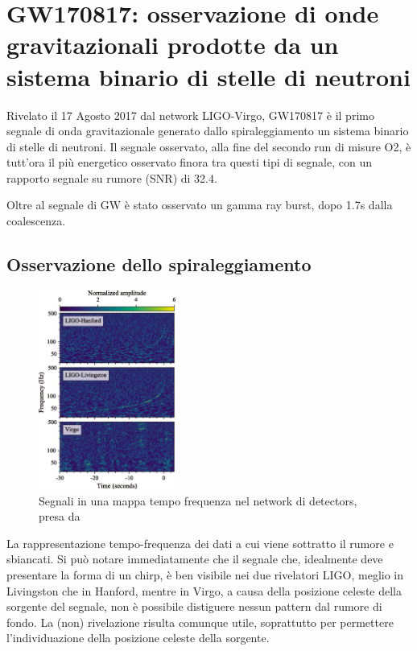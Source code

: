 \chapter[Osservazione di GW da BNS]{GW170817: osservazione di onde gravitazionali prodotte da un sistema binario di stelle di neutroni}
\label{chapter:gw170817}
Rivelato il 17 Agosto 2017 dal network LIGO-Virgo, GW170817 è il primo segnale di onda gravitazionale generato dallo spiraleggiamento un sistema binario di stelle di neutroni.
Il segnale osservato, alla fine del secondo run di misure O2, è tutt'ora il più energetico osservato finora tra questi tipi di segnale, con un rapporto segnale su rumore (SNR) di 32.4.

Oltre al segnale di GW è stato osservato un gamma ray burst, dopo 1.7s dalla coalescenza.
\section{Osservazione dello spiraleggiamento}
\label{section:osservazioneInspiralGW170817}
\begin{figure}
	\vspace{-15pt}
	\begin{center}
		\includegraphics[width=0.4\textwidth]{figures/Capitolo_2/gw170817_time_freq.png}
	\end{center}
	\vspace{-10pt}
	\caption{Segnali in una mappa tempo frequenza nel network di detectors, presa da \cite{Abbott_2017b}}
	\label{fig:osservazione_gw170817}
	\vspace{-40pt}
\end{figure}
La rappresentazione tempo-frequenza dei dati a cui viene sottratto il rumore e sbiancati. Si può notare immediatamente che il segnale che, idealmente deve presentare la forma di un chirp, è ben visibile nei due rivelatori LIGO, meglio in Livingston che in Hanford, mentre in Virgo, a causa della posizione celeste della sorgente del segnale, non è possibile distiguere nessun pattern dal rumore di fondo. La (non) rivelazione risulta comunque utile, soprattutto per permettere l'individuazione della posizione celeste della sorgente.

